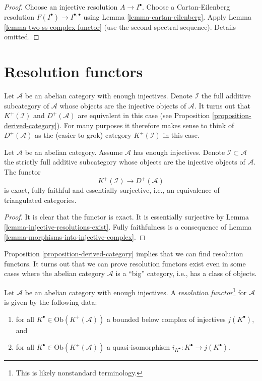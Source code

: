 \begin{proof}
Choose an injective resolution $A \to I^\bullet$.
Choose a Cartan-Eilenberg resolution
$F(I^\bullet) \to I^{\bullet, \bullet}$
using
Lemma \ref{lemma-cartan-eilenberg}.
Apply
Lemma \ref{lemma-two-ss-complex-functor}
(use the second spectral sequence).
Details omitted.
\end{proof}






\section{Resolution functors}
\label{section-derived-category}

\noindent
Let $\mathcal{A}$ be an abelian category with enough injectives.
Denote $\mathcal{I}$ the full additive subcategory of $\mathcal{A}$ whose
objects are the injective objects of $\mathcal{A}$.
It turns out that $K^{+}(\mathcal{I})$ and $D^{+}(\mathcal{A})$
are equivalent in this case (see
Proposition \ref{proposition-derived-category}).
For many purposes it therefore makes sense to think of
$D^{+}(\mathcal{A})$ as the (easier to grok) category $K^{+}(\mathcal{I})$
in this case.

\begin{proposition}
\label{proposition-derived-category}
Let $\mathcal{A}$ be an abelian category.
Assume $\mathcal{A}$ has enough injectives.
Denote $\mathcal{I} \subset \mathcal{A}$ the strictly full
additive subcategory whose objects are the injective objects of
$\mathcal{A}$.
The functor
$$
K^{+}(\mathcal{I}) \longrightarrow D^{+}(\mathcal{A})
$$
is exact, fully faithful and essentially surjective, i.e.,
an equivalence of triangulated categories.
\end{proposition}

\begin{proof}
It is clear that the functor is exact.
It is essentially surjective by
Lemma \ref{lemma-injective-resolutions-exist}.
Fully faithfulness is a consequence of
Lemma \ref{lemma-morphisms-into-injective-complex}.
\end{proof}

\noindent
Proposition \ref{proposition-derived-category}
implies that we can find resolution functors.
It turns out that we can prove resolution functors exist
even in some cases where the abelian category $\mathcal{A}$ is
a ``big'' category, i.e., has a class of objects.

\begin{definition}
\label{definition-localization-functor}
Let $\mathcal{A}$ be an abelian category with enough injectives.
A {\it resolution functor}\footnote{This is likely nonstandard terminology.}
for $\mathcal{A}$ is given by the following data:
\begin{enumerate}
\item for all $K^\bullet \in \text{Ob}(K^{+}(\mathcal{A}))$ a
bounded below complex of injectives $j(K^\bullet)$, and
\item for all $K^\bullet \in \text{Ob}(K^{+}(\mathcal{A}))$ a
quasi-isomorphism $i_{K^\bullet} : K^\bullet \to j(K^\bullet)$.
\end{enumerate}
\end{definition}

